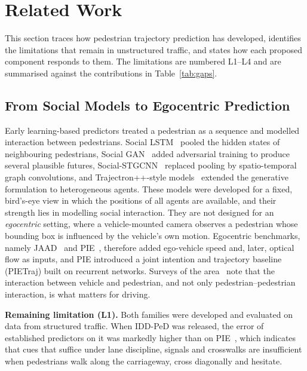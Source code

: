 \section{Related Work}\label{sec:related}
This section traces how pedestrian trajectory prediction has developed, identifies the limitations that remain in unstructured traffic, and states how each proposed component responds to them. The limitations are numbered L1--L4 and are summarised against the contributions in Table~\ref{tab:gaps}.

\subsection{From Social Models to Egocentric Prediction}
Early learning-based predictors treated a pedestrian as a sequence and modelled interaction between pedestrians. Social LSTM~\citep{alahi2016social} pooled the hidden states of neighbouring pedestrians, Social GAN~\citep{gupta2018socialgan} added adversarial training to produce several plausible futures, Social-STGCNN~\citep{mohamed2020stgcnn} replaced pooling by spatio-temporal graph convolutions, and Trajectron++-style models~\citep{salzmann2020trajectron} extended the generative formulation to heterogeneous agents. These models were developed for a fixed, bird's-eye view in which the positions of all agents are available, and their strength lies in modelling social interaction. They are not designed for an \emph{egocentric} setting, where a vehicle-mounted camera observes a pedestrian whose bounding box is influenced by the vehicle's own motion. Egocentric benchmarks, namely JAAD~\citep{rasouli2017jaad} and PIE~\citep{rasouli2019pie}, therefore added ego-vehicle speed and, later, optical flow as inputs, and PIE introduced a joint intention and trajectory baseline (PIETraj) built on recurrent networks. Surveys of the area~\citep{rasouli2020survey} note that the interaction between vehicle and pedestrian, and not only pedestrian--pedestrian interaction, is what matters for driving.

\textbf{Remaining limitation (L1).} Both families were developed and evaluated on data from structured traffic. When IDD-PeD was released, the error of established predictors on it was markedly higher than on PIE~\citep{iddped2025}, which indicates that cues that suffice under lane discipline, signals and crosswalks are insufficient when pedestrians walk along the carriageway, cross diagonally and hesitate.

